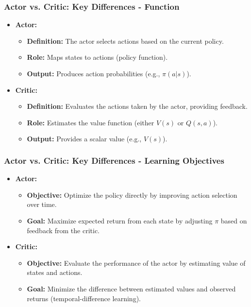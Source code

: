 \documentclass[aspectratio=169]{beamer}
\begin{document}
\begin{frame}[fragile]
    \frametitle{Actor vs. Critic: Key Differences - Function}
    
    \begin{itemize}
        \item \textbf{Actor:}
        \begin{itemize}
            \item \textbf{Definition:} The actor selects actions based on the current policy.
            \item \textbf{Role:} Maps states to actions (policy function).
            \item \textbf{Output:} Produces action probabilities (e.g., \( \pi(a|s) \)).
        \end{itemize}
        
        \item \textbf{Critic:}
        \begin{itemize}
            \item \textbf{Definition:} Evaluates the actions taken by the actor, providing feedback.
            \item \textbf{Role:} Estimates the value function (either \( V(s) \) or \( Q(s,a) \)).
            \item \textbf{Output:} Provides a scalar value (e.g., \( V(s) \)).
        \end{itemize}
    \end{itemize}
\end{frame}

\begin{frame}[fragile]
    \frametitle{Actor vs. Critic: Key Differences - Learning Objectives}
    
    \begin{itemize}
        \item \textbf{Actor:}
        \begin{itemize}
            \item \textbf{Objective:} Optimize the policy directly by improving action selection over time.
            \item \textbf{Goal:} Maximize expected return from each state by adjusting \( \pi \) based on feedback from the critic.
        \end{itemize}
        
        \item \textbf{Critic:}
        \begin{itemize}
            \item \textbf{Objective:} Evaluate the performance of the actor by estimating value of states and actions.
            \item \textbf{Goal:} Minimize the difference between estimated values and observed returns (temporal-difference learning).
        \end{itemize}
    \end{itemize}
\end{frame}
\end{document}

